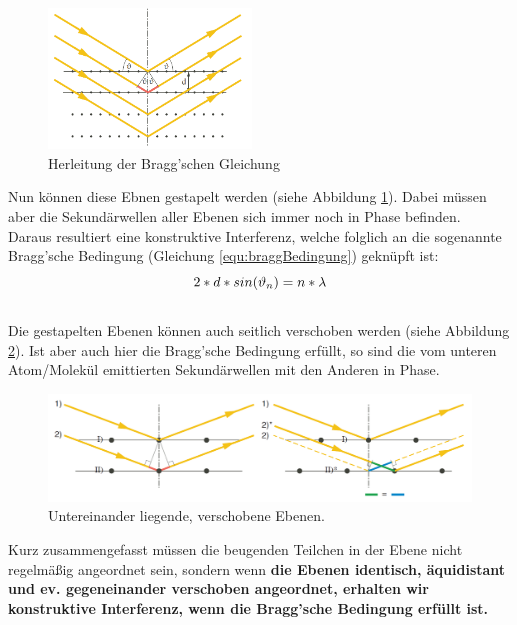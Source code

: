 \begin{figure}
\centering
\includegraphics[width=0.48\textwidth]{Bilder/baggsche_gl.png} 
\caption{Herleitung der Bragg'schen Gleichung}
\vspace{-0.5cm}
\label{fig:braggscheHerleitung}
\end{figure}
Nun können diese Ebnen gestapelt werden (siehe Abbildung \ref{fig:braggscheHerleitung}). Dabei müssen aber die Sekundärwellen aller Ebenen sich immer noch in Phase befinden.
\\[0.5cm]
Daraus resultiert eine konstruktive Interferenz, welche folglich an die sogenannte Bragg'sche Bedingung (Gleichung \ref{equ:braggBedingung}) geknüpft ist:\\
\begin{equation}
\Large
2*d*sin(\vartheta_{n})=n*\lambda
\label{equ:braggBedingung}
\end{equation}
\\[0.5cm]
Die gestapelten Ebenen können auch seitlich verschoben werden (siehe Abbildung \ref{fig:verschobeneEbenen}). Ist aber auch hier die Bragg'sche Bedingung erfüllt, so sind die vom unteren Atom/Molekül emittierten Sekundärwellen mit den Anderen in Phase.\\
\begin{figure}[H]
\centering
\includegraphics[width=\textwidth]{Bilder/unterschiedliche_anregungswege.png} 
\caption{Untereinander liegende, verschobene Ebenen.}
\label{fig:verschobeneEbenen}
\end{figure}
Kurz zusammengefasst müssen die \glqq beugenden\grqq\; Teilchen in der Ebene nicht regelmäßig angeordnet sein, sondern wenn \glqq \textbf{die Ebenen identisch, äquidistant und ev. gegeneinander verschoben angeordnet, erhalten wir konstruktive Interferenz, wenn die Bragg'sche Bedingung erfüllt ist.}\grqq\; \cite{a11}
\\[0.5cm]
